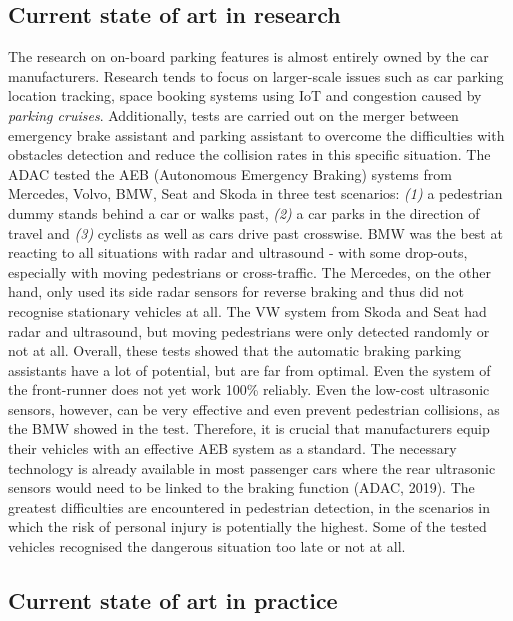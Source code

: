 \documentclass[
]{book}
\begin{document}
\hypertarget{current-state-of-art-in-research-13}{%
\subsection*{Current state of art in research}\label{current-state-of-art-in-research-13}}

The research on on-board parking features is almost entirely owned by the car manufacturers. Research tends to focus on larger-scale issues such as car parking location tracking, space booking systems using IoT and congestion caused by \emph{parking cruises}.
Additionally, tests are carried out on the merger between emergency brake assistant and parking assistant to overcome the difficulties with obstacles detection and reduce the collision rates in this specific situation. The ADAC tested the AEB (Autonomous Emergency Braking) systems from Mercedes, Volvo, BMW, Seat and Skoda in three test scenarios: \emph{(1)} a pedestrian dummy stands behind a car or walks past, \emph{(2)} a car parks in the direction of travel and \emph{(3)} cyclists as well as cars drive past crosswise.
BMW was the best at reacting to all situations with radar and ultrasound - with some drop-outs, especially with moving pedestrians or cross-traffic. The Mercedes, on the other hand, only used its side radar sensors for reverse braking and thus did not recognise stationary vehicles at all. The VW system from Skoda and Seat had radar and ultrasound, but moving pedestrians were only detected randomly or not at all.
Overall, these tests showed that the automatic braking parking assistants have a lot of potential, but are far from optimal. Even the system of the front-runner does not yet work 100\% reliably. Even the low-cost ultrasonic sensors, however, can be very effective and even prevent pedestrian collisions, as the BMW showed in the test. Therefore, it is crucial that manufacturers equip their vehicles with an effective AEB system as a standard. The necessary technology is already available in most passenger cars where the rear ultrasonic sensors would need to be linked to the braking function (ADAC, 2019).
The greatest difficulties are encountered in pedestrian detection, in the scenarios in which the risk of personal injury is potentially the highest. Some of the tested vehicles recognised the dangerous situation too late or not at all.

\hypertarget{current-state-of-art-in-practice-12}{%
\subsection*{Current state of art in practice}\label{current-state-of-art-in-practice-12}}
\end{document}
